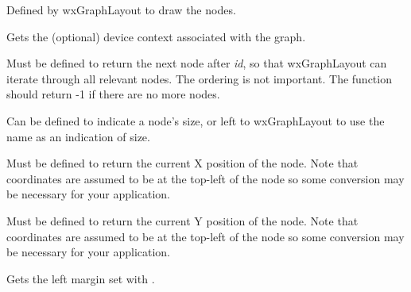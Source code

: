 Defined by wxGraphLayout to draw the nodes.



Gets the (optional) device context associated with the graph.

\label{getnextnode}


Must be defined to return the next node after {\it id}, so that wxGraphLayout can
iterate through all relevant nodes. The ordering is not important.
The function should return -1 if there are no more nodes.

\begin{comment}
\membersection{wxGraphLayout::GetNodeName}

\func{char *}{GetNodeName}{\param{long}{ id}}

May optionally be defined to get a node's name (for example if leaving
the drawing to wxGraphLayout).
\end{comment}



Can be defined to indicate a node's size, or left to wxGraphLayout to use the
name as an indication of size.

\label{getnodex}


Must be defined to return the current X position of the node. Note that
coordinates are assumed to be at the top-left of the node so some conversion
may be necessary for your application.

\label{getnodey}


Must be defined to return the current Y position of the node. Note that
coordinates are assumed to be at the top-left of the node so some conversion
may be necessary for your application.



Gets the left margin set with .

